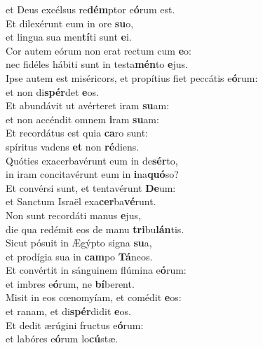 \oddverse et Deus excélsus re\textbf{dém}ptor e\textbf{ó}rum est.\\
\evenverse Et dilexérunt eum in ore \textbf{su}o,~\*\\
\evenverse et lingua sua men\textbf{tí}ti sunt \textbf{e}i.\\
\oddverse Cor autem eórum non erat rectum cum \textbf{e}o:~\*\\
\oddverse nec fidéles hábiti sunt in testa\textbf{mén}to \textbf{e}jus.\\
\evenverse Ipse autem est miséricors, et propítius fiet peccátis e\textbf{ó}rum:~\*\\
\evenverse et non di\textbf{spér}det \textbf{e}os.\\
\oddverse Et abundávit ut avérteret iram \textbf{su}am:~\*\\
\oddverse et non accéndit omnem \textbf{i}ram \textbf{su}am:\\
\evenverse Et recordátus est quia \textbf{ca}ro sunt:~\*\\
\evenverse spíritus vadens \textbf{et} non \textbf{ré}diens.\\
\oddverse Quóties exacerbavérunt eum in de\textbf{sér}to,~\*\\
\oddverse in iram concitavérunt eum in \textbf{i}na\textbf{quó}so?\\
\evenverse Et convérsi sunt, et tentavérunt \textbf{De}um:~\*\\
\evenverse et Sanctum Israël exa\textbf{cer}ba\textbf{vé}runt.\\
\oddverse Non sunt recordáti manus \textbf{e}jus,~\*\\
\oddverse die qua redémit eos de manu \textbf{tri}bu\textbf{lán}tis.\\
\evenverse Sicut pósuit in Ægýpto signa \textbf{su}a,~\*\\
\evenverse et prodígia sua in \textbf{cam}po \textbf{Tá}neos.\\
\oddverse Et convértit in sánguinem flúmina e\textbf{ó}rum:~\*\\
\oddverse et imbres e\textbf{ó}rum, ne \textbf{bí}berent.\\
\evenverse Misit in eos cœnomyíam, et comédit \textbf{e}os:~\*\\
\evenverse et ranam, et di\textbf{spér}didit \textbf{e}os.\\
\oddverse Et dedit ærúgini fructus e\textbf{ó}rum:~\*\\
\oddverse et labóres e\textbf{ó}rum lo\textbf{cú}stæ.\\
